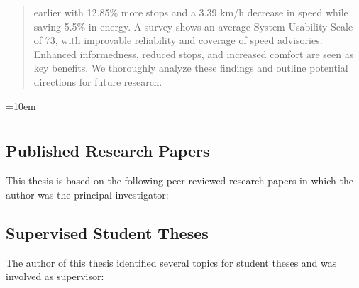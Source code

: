 \documentclass[
  ngerman,english, %
  BCOR=0mm,cdgeometry=no, %
  numbers=noenddot, %
  cd=fullcolor,
  headings=heavy,
  chapterpage=true,
  cdfont=off, %
  egregdoesnotlikesansseriftitles,
]{tudscrmanual}
\begin{document}
\begin{abstract}
earlier with 12.85\% more stops and a 3.39 km/h decrease in speed while saving 5.5\% in energy. A survey shows an average System Usability Scale of 73, with improvable reliability and coverage of speed advisories. Enhanced informedness, reduced stops, and increased comfort are seen as key benefits. We thoroughly analyze these findings and outline potential directions for future research.
\end{abstract}

\newpage

\tableofcontents




\nocite{matthes2022matching}
\nocite{matthes2023geo}
\nocite{matthes2023accurate}
\nocite{matthes2022selecting}








\nocite{*}

\newpage

\emergencystretch=10em

\chapter*{\bibname}

\section*{Published Research Papers}
This thesis is based on the following peer-reviewed research papers in which the author was the principal investigator:
\printbibliography[heading=none,nottype=student,keyword={ownpaper,related}]
\printbibliography[heading=none,nottype=student,keyword={ownpaper,notrelated}]
\pagebreak

\section*{Supervised Student Theses}
The author of this thesis identified several topics for student theses and was involved as supervisor:
\printbibliography[heading=none,type=student,notkeyword={ownpaper}]
\pagebreak
\end{document}
